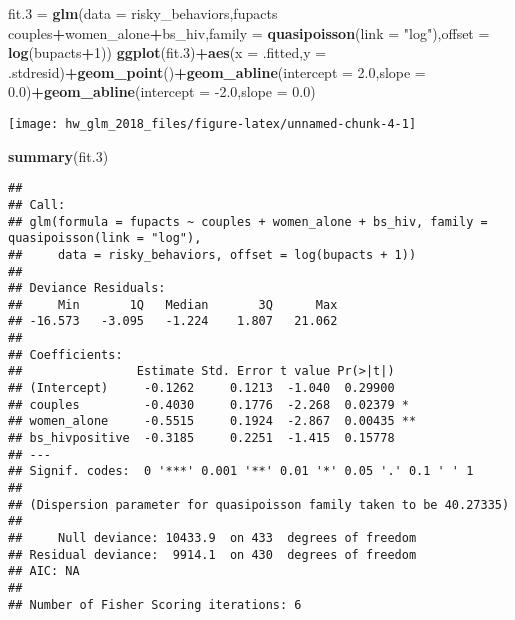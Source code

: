 \documentclass[]{article}
\newenvironment{Shaded}{\begin{snugshade}}{\end{snugshade}}
\newcommand{\DataTypeTok}[1]{\textcolor[rgb]{0.13,0.29,0.53}{#1}}
\newcommand{\DecValTok}[1]{\textcolor[rgb]{0.00,0.00,0.81}{#1}}
\newcommand{\FloatTok}[1]{\textcolor[rgb]{0.00,0.00,0.81}{#1}}
\newcommand{\KeywordTok}[1]{\textcolor[rgb]{0.13,0.29,0.53}{\textbf{#1}}}
\newcommand{\NormalTok}[1]{#1}
\newcommand{\OperatorTok}[1]{\textcolor[rgb]{0.81,0.36,0.00}{\textbf{#1}}}
\newcommand{\StringTok}[1]{\textcolor[rgb]{0.31,0.60,0.02}{#1}}
\begin{document}
\begin{Shaded}
\begin{Highlighting}[]
\NormalTok{fit}\FloatTok{.3}\NormalTok{ =}\StringTok{ }\KeywordTok{glm}\NormalTok{(}\DataTypeTok{data =}\NormalTok{ risky_behaviors,fupacts }\OperatorTok{~}\StringTok{ }\NormalTok{couples}\OperatorTok{+}\NormalTok{women_alone}\OperatorTok{+}\NormalTok{bs_hiv,}\DataTypeTok{family =} \KeywordTok{quasipoisson}\NormalTok{(}\DataTypeTok{link =} \StringTok{"log"}\NormalTok{),}\DataTypeTok{offset =} \KeywordTok{log}\NormalTok{(bupacts}\OperatorTok{+}\DecValTok{1}\NormalTok{))}
\KeywordTok{ggplot}\NormalTok{(fit}\FloatTok{.3}\NormalTok{)}\OperatorTok{+}\KeywordTok{aes}\NormalTok{(}\DataTypeTok{x =}\NormalTok{ .fitted,}\DataTypeTok{y =}\NormalTok{ .stdresid)}\OperatorTok{+}\KeywordTok{geom_point}\NormalTok{()}\OperatorTok{+}\KeywordTok{geom_abline}\NormalTok{(}\DataTypeTok{intercept =} \FloatTok{2.0}\NormalTok{,}\DataTypeTok{slope =} \FloatTok{0.0}\NormalTok{)}\OperatorTok{+}\KeywordTok{geom_abline}\NormalTok{(}\DataTypeTok{intercept =} \FloatTok{-2.0}\NormalTok{,}\DataTypeTok{slope =} \FloatTok{0.0}\NormalTok{)}
\end{Highlighting}
\end{Shaded}

\begin{center}\texttt{[image: hw\_glm\_2018\_files/figure-latex/unnamed-chunk-4-1]} \end{center}

\begin{Shaded}
\begin{Highlighting}[]
\KeywordTok{summary}\NormalTok{(fit}\FloatTok{.3}\NormalTok{)}
\end{Highlighting}
\end{Shaded}

\begin{verbatim}
## 
## Call:
## glm(formula = fupacts ~ couples + women_alone + bs_hiv, family = quasipoisson(link = "log"), 
##     data = risky_behaviors, offset = log(bupacts + 1))
## 
## Deviance Residuals: 
##     Min       1Q   Median       3Q      Max  
## -16.573   -3.095   -1.224    1.807   21.062  
## 
## Coefficients:
##                Estimate Std. Error t value Pr(>|t|)   
## (Intercept)     -0.1262     0.1213  -1.040  0.29900   
## couples         -0.4030     0.1776  -2.268  0.02379 * 
## women_alone     -0.5515     0.1924  -2.867  0.00435 **
## bs_hivpositive  -0.3185     0.2251  -1.415  0.15778   
## ---
## Signif. codes:  0 '***' 0.001 '**' 0.01 '*' 0.05 '.' 0.1 ' ' 1
## 
## (Dispersion parameter for quasipoisson family taken to be 40.27335)
## 
##     Null deviance: 10433.9  on 433  degrees of freedom
## Residual deviance:  9914.1  on 430  degrees of freedom
## AIC: NA
## 
## Number of Fisher Scoring iterations: 6
\end{verbatim}
\end{document}
